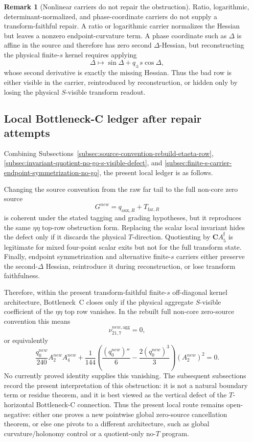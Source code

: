 \documentclass[11pt,a4paper]{amsart}
\def\new{new}%
\theoremstyle{plain}
\theoremstyle{definition}
\newtheorem{remark}[theorem]{Remark}
\newcommand{\new}{\mathrm{new}}
\begin{document}
\begin{remark}[Nonlinear carriers do not repair the obstruction]
\label{rem:nonlinear-carriers-do-not-repair-etaeta-row}
Ratio, logarithmic, determinant-normalized, and phase-coordinate carriers do
not supply a transform-faithful repair.  A ratio or logarithmic carrier
normalizes the Hessian but leaves a nonzero endpoint-curvature term.  A phase
coordinate such as \(\Delta\) is affine in the source and therefore has zero
second \(\Delta\)-Hessian, but reconstructing the physical finite-\(s\) kernel
requires applying
\[
\Delta\mapsto \sin\Delta+q_\pm s\cos\Delta,
\]
whose second derivative is exactly the missing Hessian.  Thus the bad row is
either visible in the carrier, reintroduced by reconstruction, or hidden only
by losing the physical \(S\)-visible transform readout.
\end{remark}

\subsection{Local Bottleneck-C ledger after repair attempts}
\label{subsec:local-bottleneck-c-ledger-after-repairs}

Combining
Subsections~\ref{subsec:source-convention-rebuild-etaeta-row},
\ref{subsec:invariant-quotient-no-go-s-visible-defect}, and
\ref{subsec:finite-s-carrier-endpoint-symmetrization-no-go}, the present local
ledger is as follows.

Changing the source convention from the raw far tail to the full non-core
zero source
\[
G^{\new}=q_{\mathrm{aux},R}+T_{\mathrm{far},R}
\]
is coherent under the stated tagging and grading hypotheses, but it reproduces
the same \(\eta\eta\) top-row obstruction form.  Replacing the scalar local
invariant hides the defect only if it discards the physical \(T\)-direction.
Quotienting by \(\mathbf C A_5^{\mathfrak f}\) is legitimate for mixed
four-point scalar exits but not for the full transform state.  Finally,
endpoint symmetrization and alternative finite-\(s\) carriers either preserve
the second-\(\Delta\) Hessian, reintroduce it during reconstruction, or lose
transform faithfulness.

Therefore, within the present transform-faithful finite-\(s\) off-diagonal
kernel architecture, Bottleneck~C closes only if the physical aggregate
\(S\)-visible coefficient of the \(\eta\eta\) top row vanishes.  In the rebuilt
full non-core zero-source convention this means
\[
\nu_{21,7}^{\new,\mathrm{agg}}=0,
\]
or equivalently
\[
\frac{q_0^{\new}}{240}A_2^{\new}A_4^{\new}
+
\frac{1}{144}
\left(
\frac{(q_0^{\new})''}{6}
-
\frac{2(q_0^{\new})^3}{3}
\right)
(A_2^{\new})^2
=
0.
\]
No currently proved identity supplies this vanishing.  The subsequent
subsections record the present interpretation of this obstruction: it is not a
natural boundary term or residue theorem, and it is best viewed as the
vertical defect of the \(T\)-horizontal Bottleneck-C connection.  Thus the
present local route remains open-negative: either one proves a new pointwise
global zero-source cancellation theorem, or else one pivots to a different
architecture, such as global curvature/holonomy control or a quotient-only
no-\(T\) program.
\end{document}
